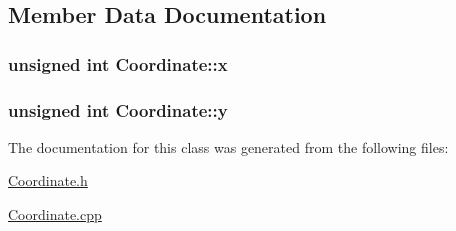 \subsection{Member Data Documentation}
\subsubsection[{\texorpdfstring{x}{x}}]{\setlength{\rightskip}{0pt plus 5cm}unsigned int Coordinate\+::x\hspace{0.3cm}{\ttfamily [private]}}\hypertarget{class_coordinate_aed3fecfb15ebabe5b4905820c1999b0b}{}\label{class_coordinate_aed3fecfb15ebabe5b4905820c1999b0b}
\subsubsection[{\texorpdfstring{y}{y}}]{\setlength{\rightskip}{0pt plus 5cm}unsigned int Coordinate\+::y\hspace{0.3cm}{\ttfamily [private]}}\hypertarget{class_coordinate_a13eedbab9e112ef9f8685c12f1aed009}{}\label{class_coordinate_a13eedbab9e112ef9f8685c12f1aed009}


The documentation for this class was generated from the following files\+:\begin{DoxyCompactItemize}
\item 
\hyperlink{_coordinate_8h}{Coordinate.\+h}\item 
\hyperlink{_coordinate_8cpp}{Coordinate.\+cpp}\end{DoxyCompactItemize}
